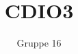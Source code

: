 \documentclass[12pt,a4paper]{paper}
\author{Gruppe 16}
\title{CDIO3}
\begin{document}
        
        \pagebreak
        
        \pagebreak
    
\end{document}
